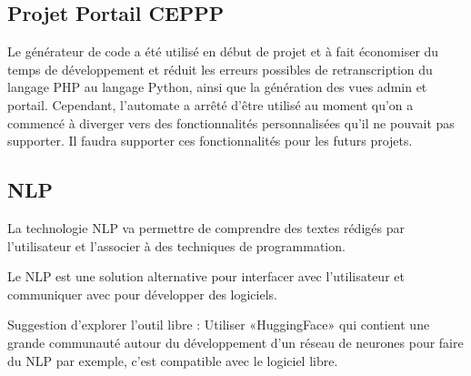\subsection{Projet Portail CEPPP}
Le générateur de code a été utilisé en début de projet et à fait économiser du temps de développement et réduit les erreurs possibles de retranscription du langage PHP au langage Python, ainsi que la génération des vues admin et portail. Cependant, l’automate a arrêté d’être utilisé au moment qu’on a commencé à diverger vers des fonctionnalités personnalisées qu’il ne pouvait pas supporter. Il faudra supporter ces fonctionnalités pour les futurs projets.


\subsection{NLP}
La technologie NLP va permettre de comprendre des textes rédigés par l’utilisateur et l’associer à des techniques de programmation.



Le NLP est une solution alternative pour interfacer avec l’utilisateur et communiquer avec pour développer des logiciels.

Suggestion d’explorer l’outil libre : Utiliser «HuggingFace» qui contient une grande communauté autour du développement d’un réseau de neurones pour faire du NLP par exemple, c’est compatible avec le logiciel libre.



